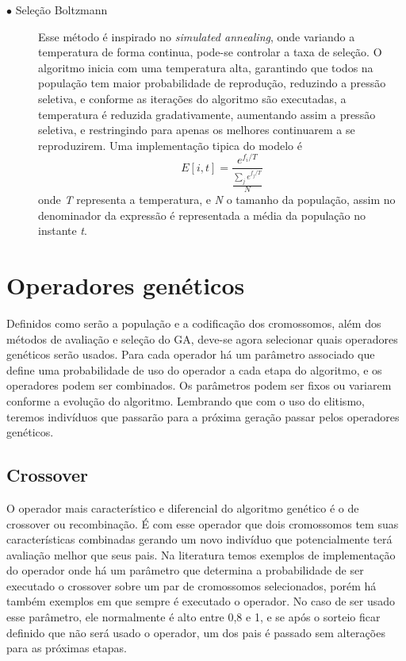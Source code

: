 \begin{description}
\item[$\bullet$ Seleção Boltzmann] \text{}

Esse método é inspirado no \textit{simulated annealing}, onde variando a temperatura de forma continua, pode-se controlar a taxa de seleção. O algoritmo inicia com uma temperatura alta, garantindo que todos na população tem maior probabilidade de reprodução, reduzindo a pressão seletiva, e conforme as iterações do algoritmo são executadas, a temperatura é reduzida gradativamente, aumentando assim a pressão seletiva, e restringindo para apenas os melhores continuarem a se reproduzirem. Uma implementação tipica do modelo é \[ E[i,t] = \frac{e^{f_i/T}}{\frac{\sum_j e^{f_j/T}}{N}}\] onde \textit{T} representa a temperatura, e \textit{N} o tamanho da população, assim no denominador da expressão é representada a média da população no instante \textit{t}. \cite{Mitchell1996}

\end{description}

\section{Operadores genéticos}

Definidos como serão a população e a codificação dos cromossomos, além dos métodos de avaliação e seleção do GA, deve-se agora selecionar quais operadores genéticos serão usados. Para cada operador há um parâmetro associado que define uma probabilidade de uso do operador a cada etapa do algoritmo, e os operadores podem ser combinados. Os parâmetros podem ser fixos ou variarem conforme a evolução do algoritmo. Lembrando que com o uso do elitismo, teremos indivíduos que passarão para a próxima geração passar pelos operadores genéticos.

\subsection{Crossover}
O operador mais característico e diferencial do algoritmo genético é o de crossover ou recombinação. É com esse operador que dois cromossomos tem suas características combinadas gerando um novo indivíduo que potencialmente terá avaliação melhor que seus pais. Na literatura temos exemplos de implementação do operador onde há um parâmetro que determina a probabilidade de ser executado o crossover sobre um par de cromossomos selecionados, porém há também exemplos em que sempre é executado o operador. No caso de ser usado esse parâmetro, ele normalmente é alto entre 0,8 e 1, e se após o sorteio ficar definido que não será usado o operador, um dos pais é passado sem alterações para as próximas etapas.

